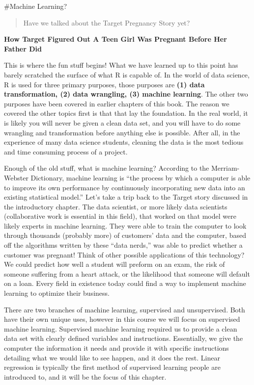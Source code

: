 \documentclass[
]{book}
\begin{document}
\#Machine Learning?

\begin{quote}
Have we talked about the Target Pregnancy Story yet?
\end{quote}

\textbf{How Target Figured Out A Teen Girl Was Pregnant Before Her Father Did}

This is where the fun stuff begins! What we have learned up to this point has barely scratched the surface of what R is capable of. In the world of data science, R is used for three primary purposes, those purposes are \textbf{(1) data transformation, (2) data wrangling, (3) machine learning}. The other two purposes have been covered in earlier chapters of this book. The reason we covered the other topics first is that that lay the foundation. In the real world, it is likely you will never be given a clean data set, and you will have to do some wrangling and transformation before anything else is possible. After all, in the experience of many data science students, cleaning the data is the most tedious and time consuming process of a project.

Enough of the old stuff, what is machine learning? According to the Merriam-Webster Dictionary, machine learning is ``the process by which a computer is able to improve its own performance by continuously incorporating new data into an existing statistical model.'' Let's take a trip back to the Target story discussed in the introductory chapter. The data scientist, or more likely data scientists (collaborative work is essential in this field), that worked on that model were likely experts in machine learning. They were able to train the computer to look through thousands (probably more) of customers' data and the computer, based off the algorithms written by these ``data nerds,'' was able to predict whether a customer was pregnant! Think of other possible applications of this technology? We could predict how well a student will preform on an exam, the risk of someone suffering from a heart attack, or the likelihood that someone will default on a loan. Every field in existence today could find a way to implement machine learning to optimize their business.

There are two branches of machine learning, supervised and unsupervised. Both have their own unique uses, however in this course we will focus on supervised machine learning. Supervised machine learning required us to provide a clean data set with clearly defined variables and instructions. Essentially, we give the computer the information it needs and provide it with specific instructions detailing what we would like to see happen, and it does the rest. Linear regression is typically the first method of supervised learning people are introduced to, and it will be the focus of this chapter.
\end{document}
